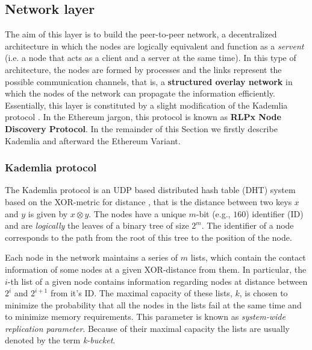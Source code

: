 \subsection{Network layer}
\label{sec:network-layer}

The aim of this layer is to build the peer-to-peer network, a decentralized
architecture in which the nodes are logically equivalent and function as a
\emph{servent} (i.e. a node that acts as a client and a server at the same
time). In this type of architecture, the nodes are formed by processes and the
links represent the possible communication channels, that is, a
\textbf{structured overlay network} \cite{van2017distributed} in which the nodes
of the network can propagate the information efficiently. Essentially, this
layer is constituted by a slight modification of the Kademlia protocol
\cite{bib:kademlia}. In the Ethereum jargon, this protocol is known as
\textbf{RLPx Node Discovery Protocol}.
In the remainder of this Section we firstly describe Kademlia and afterward
the Ethereum Variant.


\subsubsection{Kademlia protocol}
The Kademlia protocol is an UDP based distributed hash table (DHT)
system based on the
XOR-metric for distance \cite{bib:kademlia}, that is the distance between two
keys $x$ and $y$ is given by $x \otimes y$.
The nodes have a unique $m$-bit (e.g., $160$) identifier (ID) and are 
\emph{logically} the leaves of a binary tree of size $2^m$. 
The identifier of a node corresponds
to the path from the root of this tree to the position of the node.

Each node in the network maintains a series of $m$
lists, which contain the contact information of some nodes at a given
XOR-distance from them.
In particular, the $i$-th list of a given node contains
information regarding nodes at distance between $2^i$ and $2^{i+1}$ from 
it's ID.
The maximal capacity of these lists, $k$, is chosen to minimize the
probability that all the nodes in the lists fail at the same 
time and to minimize memory requirements.
This parameter is  known as \emph{system-wide replication parameter}.
Because of their maximal capacity the lists are usually denoted by the term
\emph{k-bucket}.


